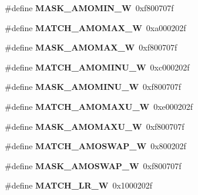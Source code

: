 \begin{DoxyCompactItemize}
\mbox{\label{riscv-utility_8h_a57a228ba2840e23128c5fe5d4a0822d1}} 
\#define {\bfseries M\+A\+S\+K\+\_\+\+A\+M\+O\+M\+I\+N\+\_\+W}~0xf800707f
\item 
\mbox{\label{riscv-utility_8h_a08853595fad6873e06496506ef68ec0c}} 
\#define {\bfseries M\+A\+T\+C\+H\+\_\+\+A\+M\+O\+M\+A\+X\+\_\+W}~0xa000202f
\item 
\mbox{\label{riscv-utility_8h_ae1fc4f715bf7331466556cae9f64c9be}} 
\#define {\bfseries M\+A\+S\+K\+\_\+\+A\+M\+O\+M\+A\+X\+\_\+W}~0xf800707f
\item 
\mbox{\label{riscv-utility_8h_a62e8dac3e4c47ec2c9f2380a526170ee}} 
\#define {\bfseries M\+A\+T\+C\+H\+\_\+\+A\+M\+O\+M\+I\+N\+U\+\_\+W}~0xc000202f
\item 
\mbox{\label{riscv-utility_8h_a04d264119356c16141ef47ef426b885c}} 
\#define {\bfseries M\+A\+S\+K\+\_\+\+A\+M\+O\+M\+I\+N\+U\+\_\+W}~0xf800707f
\item 
\mbox{\label{riscv-utility_8h_ac7d55b9799f3cd547c527a24dc45f6a7}} 
\#define {\bfseries M\+A\+T\+C\+H\+\_\+\+A\+M\+O\+M\+A\+X\+U\+\_\+W}~0xe000202f
\item 
\mbox{\label{riscv-utility_8h_a318a1563bc2ba3da4224c38bd9b33f94}} 
\#define {\bfseries M\+A\+S\+K\+\_\+\+A\+M\+O\+M\+A\+X\+U\+\_\+W}~0xf800707f
\item 
\mbox{\label{riscv-utility_8h_a7f40b6d5ecb1c038bab3b3412732cd69}} 
\#define {\bfseries M\+A\+T\+C\+H\+\_\+\+A\+M\+O\+S\+W\+A\+P\+\_\+W}~0x800202f
\item 
\mbox{\label{riscv-utility_8h_ad3e1deba209d850cc9d0a5d2dec19748}} 
\#define {\bfseries M\+A\+S\+K\+\_\+\+A\+M\+O\+S\+W\+A\+P\+\_\+W}~0xf800707f
\item 
\mbox{\label{riscv-utility_8h_a568b2ca769431239c5e0783bb295a9d9}} 
\#define {\bfseries M\+A\+T\+C\+H\+\_\+\+L\+R\+\_\+W}~0x1000202f
\item 
\mbox{\label{riscv-utility_8h_a1655baf42f3fc63767a0521b32d6472f}} 

\end{DoxyCompactItemize}

